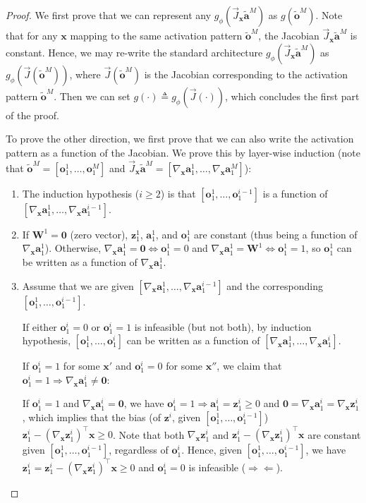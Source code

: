 \documentclass{article} \usepackage{iclr2020_conference,times}
\def\va{{\bm{a}}}
\def\vo{{\bm{o}}}
\def\vx{{\bm{x}}}
\def\vz{{\bm{z}}}
\def\mW{{\bm{W}}}
\begin{document}
\begin{proof}
We first prove that we can represent any $g_\phi(\vec J_\vx \tilde \va^M)$ as $g(\tilde \vo^M)$. Note that for any $\vx$ mapping to the same activation pattern $\tilde \vo^M$, the Jacobian $\vec J_\vx \tilde \va^M$ is constant. Hence, we may re-write the standard architecture $g_\phi(\vec J_\vx \tilde \va^M)$ as $g_\phi(\vec J(\tilde \vo^M))$, where $\vec J(\tilde \vo^M)$ is the Jacobian corresponding to the activation pattern $\tilde \vo^M$. Then we can set $g(\cdot) \triangleq g_\phi(\vec J(\cdot))$, which concludes the first part of the proof. 

To prove the other direction, we first prove that we can also write the activation pattern as a function of the Jacobian. We prove this by layer-wise induction (note that $\tilde \vo^M = [\vo^1_1,\dots,\vo^M_1]$ and $\vec J_\vx \tilde \va^M = [\nabla_\vx \va^1_1,\dots,\nabla_\vx \va^M_1]$):
\begin{enumerate}[leftmargin=4mm]
    \item The induction hypothesis ($i \geq 2$) is that $[\vo^1_1,\dots,\vo^{i-1}_1]$ is a function of $[\nabla_\vx \va^1_1, \dots, \nabla_\vx  \va^{i-1}_1]$.\!\!\!\!\!
    \item If $\mW^1 = \textbf{0}$ (zero vector), $\vz^1_1$, $\va^1_1$, and $\vo^1_1$ are constant (thus being a function of $\nabla_\vx \va^1_1$). Otherwise, $\nabla_\vx \va^1_1 = \textbf{0} \Leftrightarrow \vo^1_1 = 0$ and $\nabla_\vx \va^1_1 = \mW^1 \Leftrightarrow \vo^1_1 = 1$, so $\vo^1_1$ can be written as a function of $\nabla_\vx \va^1_1$.\!\!\!\!\!
    \item Assume that we are given $[\nabla_\vx \va^1_1, \dots, \nabla_\vx  \va^{i-1}_1]$ and the corresponding $[\vo^1_1,\dots,\vo^{i-1}_1]$.
    
    If either $\vo^i_1 = 0$ or $\vo^i_1 = 1$ is infeasible (but not both), by induction hypothesis, $[\vo^1_1,\dots,\vo^{i}_1]$ can be written as a function of $[\nabla_\vx \va^1_1, \dots , \nabla_\vx  \va^{i}_1]$. 
    
    If $\vo^i_1 = 1$ for some $\vx'$ and $\vo^i_1 = 0$ for some $\vx''$, we claim that $\vo^i_1 = 1 \Rightarrow \nabla_\vx \va^i_1 \neq \textbf{0}$:
    
    If $\vo^i_1 = 1$ and $\nabla_\vx \va^i_1 = \textbf{0}$, we have $\vo^i_1 = 1 \Rightarrow \va^i_1 = \vz^i_1 \geq 0$ and $\textbf{0} = \nabla_\vx \va^i_1 = \nabla_\vx \vz^i_1$, which implies that the bias (of $\vz^i$, given $[\vo^1_1,\dots,\vo^{i-1}_1]$) $\vz^i_1 - (\nabla_\vx \vz^i_1)^\top \vx \geq 0$. Note that both $\nabla_\vx \vz^i_1$ and $\vz^i_1 - (\nabla_\vx \vz^i_1)^\top \vx$ are constant given $[\vo^1_1,\dots,\vo^{i-1}_1]$, regardless of $\vo^i_1$. Hence, given $[\vo^1_1,\dots,\vo^{i-1}_1]$, we have $\vz^i_1 = \vz^i_1 - (\nabla_\vx \vz^i_1)^\top \vx \geq 0$ and $\vo^i_1 = 0$ is infeasible ($\Rightarrow\!\Leftarrow$). 



\end{enumerate}
\end{proof}
\end{document}
